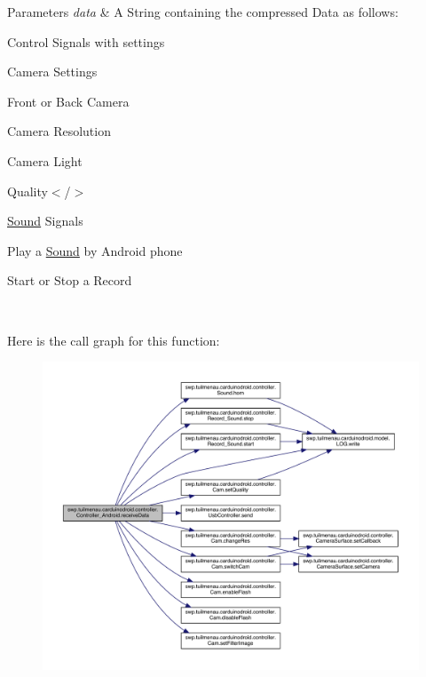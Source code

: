\begin{DoxyParams}{Parameters}
{\em data} & A String containing the compressed Data as follows\+: 
\begin{DoxyEnumerate}
\item Control Signals with settings 
\item Camera Settings 
\begin{DoxyEnumerate}
\item Front or Back Camera 
\item Camera Resolution 
\item Camera Light 
\item Quality$<$/$>$ 
\end{DoxyEnumerate}
\item \hyperlink{classswp_1_1tuilmenau_1_1carduinodroid_1_1controller_1_1_sound}{Sound} Signals 
\begin{DoxyEnumerate}
\item Play a \hyperlink{classswp_1_1tuilmenau_1_1carduinodroid_1_1controller_1_1_sound}{Sound} by Android phone 
\item Start or Stop a Record 
\end{DoxyEnumerate}
\end{DoxyEnumerate}\\
\hline
\end{DoxyParams}


Here is the call graph for this function\+:
\nopagebreak
\begin{figure}[H]
\begin{center}
\leavevmode
\includegraphics[width=350pt]{classswp_1_1tuilmenau_1_1carduinodroid_1_1controller_1_1_controller___android_aee7580998e493c8fafa0ddd0dff31704_cgraph}
\end{center}
\end{figure}




